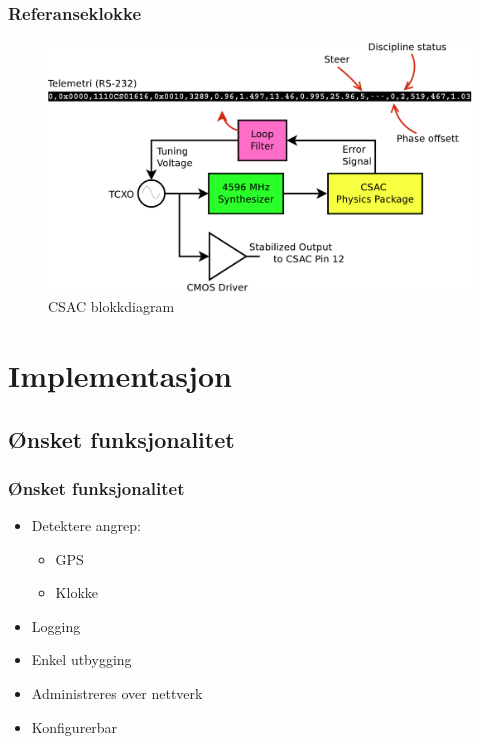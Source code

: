 \documentclass[xcolor=table]{beamer}
\begin{document}
\begin{frame}
  \frametitle{Referanseklokke}
      \begin{figure}
        \includegraphics[scale=0.35]{thesis/graphics/csac_schematic.pdf}
      \caption{CSAC blokkdiagram}
    \end{figure}
\end{frame}

\section{Implementasjon}
\subsection{Ønsket funksjonalitet}
\begin{frame}
  \frametitle{Ønsket funksjonalitet}
  \begin{itemize}
    \item Detektere angrep:
      \begin{itemize}
        \item GPS
        \item Klokke
      \end{itemize}
    \item Logging
    \item Enkel utbygging
    \item Administreres over nettverk
    \item Konfigurerbar 
  \end{itemize}
\end{frame}
\end{document}
